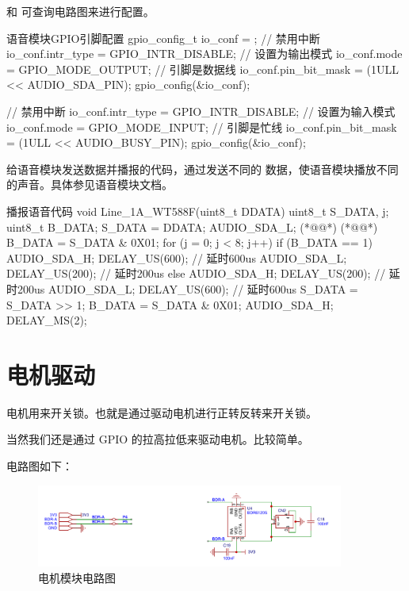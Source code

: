 \documentclass[lang=cn,newtx,10pt,scheme=chinese]{elegantbook}
\begin{document}
 和  可查询电路图来进行配置。

\begin{mycode}{语音模块GPIO引脚配置}
gpio_config_t io_conf = {};
// 禁用中断
io_conf.intr_type = GPIO_INTR_DISABLE;
// 设置为输出模式
io_conf.mode = GPIO_MODE_OUTPUT;
// 引脚是数据线
io_conf.pin_bit_mask = (1ULL << AUDIO_SDA_PIN);
gpio_config(&io_conf);

// 禁用中断
io_conf.intr_type = GPIO_INTR_DISABLE;
// 设置为输入模式
io_conf.mode = GPIO_MODE_INPUT;
// 引脚是忙线
io_conf.pin_bit_mask = (1ULL << AUDIO_BUSY_PIN);
gpio_config(&io_conf);
\end{mycode}

给语音模块发送数据并播报的代码，通过发送不同的  数据，使语音模块播放不同的声音。具体参见语音模块文档。

\begin{mycode}{播报语音代码}
void Line_1A_WT588F(uint8_t DDATA)
{
    uint8_t S_DATA, j;
    uint8_t B_DATA;
    S_DATA = DDATA;
    AUDIO_SDA_L;
    (*@@*) (*@@*)
    B_DATA = S_DATA & 0X01;
    for (j = 0; j < 8; j++)
    {
        if (B_DATA == 1)
        {
            AUDIO_SDA_H;
            DELAY_US(600); // 延时600us
            AUDIO_SDA_L;
            DELAY_US(200); // 延时200us
        }
        else
        {
            AUDIO_SDA_H;
            DELAY_US(200); // 延时200us
            AUDIO_SDA_L;
            DELAY_US(600); // 延时600us
        }
        S_DATA = S_DATA >> 1;
        B_DATA = S_DATA & 0X01;
    }
    AUDIO_SDA_H;
    DELAY_MS(2);
}
\end{mycode}

\chapter{电机驱动}

电机用来开关锁。也就是通过驱动电机进行正转反转来开关锁。

当然我们还是通过 GPIO 的拉高拉低来驱动电机。比较简单。

电路图如下：

\begin{figure}[!htb]
\centering
\includegraphics[width=0.9\textwidth]{motor.png}
\caption{电机模块电路图}
\end{figure}
\end{document}
